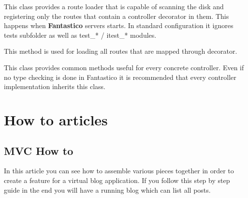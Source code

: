\documentclass[letterpaper,10pt,english]{sphinxmanual}
\begin{document}
\begin{fulllineitems}
\label{features/mvc:fantastico.mvc.controller_registrator.ControllerRouteLoader}
This class provides a route loader that is capable of scanning the disk and registering only the routes that 
contain a controller decorator in them. This happens when \textbf{Fantastico} servers starts. In standard configuration
it ignores tests subfolder as well as test\_* / itest\_* modules.

\begin{fulllineitems}
\label{features/mvc:fantastico.mvc.controller_registrator.ControllerRouteLoader.load_routes}
This method is used for loading all routes that are mapped through 
{\hyperref[features/mvc:fantastico.mvc.controller_decorators.Controller]{}} decorator.

\end{fulllineitems}


\end{fulllineitems}


\begin{fulllineitems}
\label{features/mvc:fantastico.mvc.base_controller.BaseController}
This class provides common methods useful for every concrete controller. Even if no type checking is done in 
Fantastico it is recommended that every controller implementation inherits this class.

\end{fulllineitems}



\chapter{How to articles}
\label{how_to/how_to:how-to-articles}\label{how_to/how_to::doc}

\section{MVC How to}
\label{how_to/mvc_how_to::doc}\label{how_to/mvc_how_to:mvc-how-to}
In this article you can see how to assemble various pieces together in order to create a feature for a virtual blog application.
If you follow this step by step guide in the end you will have a running blog which can list all posts.
\end{document}
